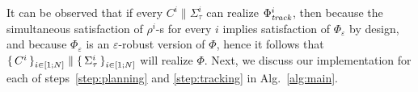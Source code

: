 It can be observed that if every  $C^i\parallel \Sigma_\tau^i$ can realize $\Phi_{\mathit{track}}^i$, then because the simultaneous satisfaction of $\rho^i$-s for every $i$ implies satisfaction of $\Phi_\varepsilon$ by design, and because $\Phi_\varepsilon$ is an $\varepsilon$-robust version of $\Phi$, hence it follows that $\set{C^i}_{i\in [1;N]}\parallel \set{\Sigma_\tau^i}_{i\in [1;N]}$ will realize $\Phi$. Next, we discuss our implementation for each of steps~\ref{step:planning} and \ref{step:tracking} in Alg.~\ref{alg:main}.




